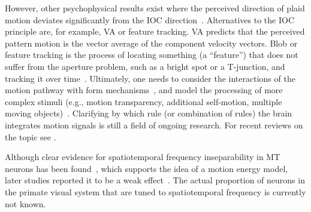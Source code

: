 However, other psychophysical results exist where the
perceived direction of plaid motion deviates significantly from
the \ac{IOC} direction~\citep{FerreraWilson1990,BurkeWenderoth1993}.
Alternatives to the \ac{IOC} principle are, for
example, \ac{VA} or feature tracking. \ac{VA} predicts
that the perceived pattern motion is the vector average of the
component velocity vectors. Blob or feature tracking is the
process of locating something (a ``feature'') that does not suffer
from the aperture problem, such as a bright spot or a T-junction,
and tracking it over time~\citep{Wilson1992}.
Ultimately, one needs to consider the interactions of the motion
pathway with form mechanisms~\citep{Majaj2007}, and
model the processing of more complex stimuli (e.g., motion
transparency, additional self-motion, multiple moving 
objects)~\citep{Raudies2011,Layton2012}. Clarifying by which
rule (or combination of rules) the brain integrates motion
signals is still a field of ongoing research. For recent reviews
on the topic see \cite{BradleyGoyal2008,Nishida2011}.

Although clear evidence for spatiotemporal frequency inseparability
in \ac{MT} neurons has been found~\citep{PerroneThiele2001},
which supports the idea of a motion energy
model, later studies reported it to be a weak 
effect~\citep{Priebe2003,Priebe2006}. 
The actual proportion of neurons in the
primate visual system that are tuned to spatiotemporal frequency
is currently not known.


